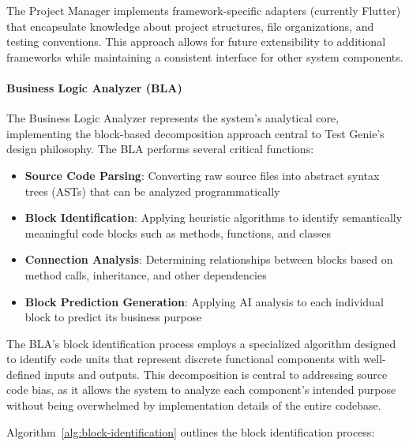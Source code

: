 \hspace{0.5cm}The Project Manager implements framework-specific adapters (currently Flutter) that encapsulate knowledge about project structures, file organizations, and testing conventions. This approach allows for future extensibility to additional frameworks while maintaining a consistent interface for other system components.

\paragraph{Business Logic Analyzer (BLA)}
\hspace{0.5cm}The Business Logic Analyzer represents the system's analytical core, implementing the block-based decomposition approach central to Test Genie's design philosophy. The BLA performs several critical functions:

\begin{itemize}
    \item \textbf{Source Code Parsing}: Converting raw source files into abstract syntax trees (ASTs) that can be analyzed programmatically
    
    \item \textbf{Block Identification}: Applying heuristic algorithms to identify semantically meaningful code blocks such as methods, functions, and classes
    
    \item \textbf{Connection Analysis}: Determining relationships between blocks based on method calls, inheritance, and other dependencies
    
    \item \textbf{Block Prediction Generation}: Applying AI analysis to each individual block to predict its business purpose
\end{itemize}

\hspace{0.5cm}The BLA's block identification process employs a specialized algorithm designed to identify code units that represent discrete functional components with well-defined inputs and outputs. This decomposition is central to addressing source code bias, as it allows the system to analyze each component's intended purpose without being overwhelmed by implementation details of the entire codebase.

\hspace{0.5cm}Algorithm~\ref{alg:block-identification} outlines the block identification process:

